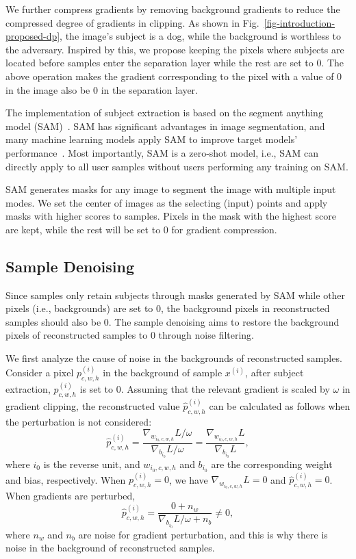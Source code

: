 \documentclass[lettersize,journal]{IEEEtran}
\begin{document}
We further compress gradients by removing background gradients to reduce the compressed degree of gradients in clipping. As shown in Fig.~\ref{fig-introduction-proposed-dp}, the image's subject is a dog, while the background is worthless to the adversary. Inspired by this, we propose keeping the pixels where subjects are located before samples enter the separation layer while the rest are set to 0. The above operation makes the gradient corresponding to the pixel with a value of 0 in the image also be 0 in the separation layer.

The implementation of subject extraction is based on the segment anything model (SAM)~\cite{kirillov2023segment}. SAM has significant advantages in image segmentation, and many machine learning models apply SAM to improve target models' performance~\cite{zhang2023comprehensive, ma2023segment,jing2023segment}. Most importantly, SAM is a zero-shot model, i.e., SAM can directly apply to all user samples without users performing any training on SAM.

SAM generates masks for any image to segment the image with multiple input modes. We set the center of images as the selecting (input) points and apply masks with higher scores to samples. Pixels in the mask with the highest score are kept, while the rest will be set to 0 for gradient compression.

\subsection{Sample Denoising}
\label{section-noise-filtering}

Since samples only retain subjects through masks generated by SAM while other pixels (i.e., backgrounds) are set to 0, the background pixels in reconstructed samples should also be 0. The sample denoising aims to restore the background pixels of reconstructed samples to 0 through noise filtering.

We first analyze the cause of noise in the backgrounds of reconstructed samples. Consider a pixel $p^{(i)}_{c,w,h}$ in the background of sample $x^{\left( i\right)}$, after subject extraction, $p^{(i)}_{c,w,h}$ is set to 0. Assuming that the relevant gradient is scaled by $\omega$ in gradient clipping, the reconstructed value $\hat{p}^{(i)}_{c,w,h}$ can be calculated as follows when the perturbation is not considered:
\begin{equation}
\hat{p}^{(i)}_{c,w,h} = \frac{\nabla_{w_{i_0, c,w,h}} L / \omega}{\nabla_{b_{i_0}} L / \omega} = \frac{\nabla_{w_{i_0, c,w,h}}L}{\nabla_{b_{i_0}}L},
\end{equation}
where $i_0$ is the reverse unit, and $w_{i_0, c,w,h}$ and $b_{i_0}$ are the corresponding weight and bias, respectively. When $p^{(i)}_{c,w,h} = 0$, we have $\nabla_{w_{i_0, c,w,h}}L = 0$ and $\hat{p}^{(i)}_{c,w,h} = 0$. When gradients are perturbed,
\begin{equation}
\label{eq-reconstructed-pixel}
\hat{p}^{(i)}_{c,w,h} = \frac{ 0 + n_w }{\nabla_{b_{i_0}} L / \omega + n_b} \neq 0,
\end{equation}
where $n_w$ and $n_b$ are noise for gradient perturbation, and this is why there is noise in the background of reconstructed samples.
\end{document}
